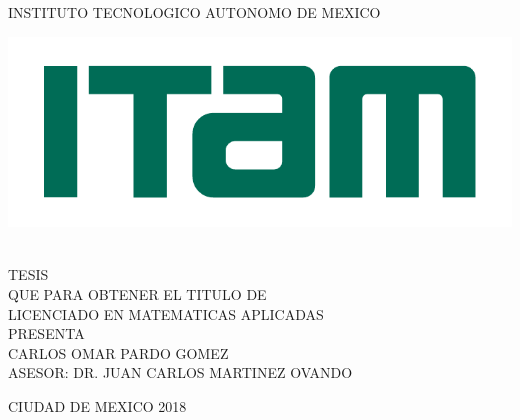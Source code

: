 \begin{titlepage}
\begin{center}

\large{INSTITUTO TECNOLOGICO AUTONOMO DE MEXICO}\\[2em]
\hline

\begin{center}
	\includegraphics{Figures/Miscellaneous/logo-ITAM.pdf}
\end{center}

\vspace{1em}

{}\\[2em]

\textsc{\large TESIS}\\[1em]

\textsc{\normalsize QUE PARA OBTENER EL TITULO DE}\\[1em]

\textsc{\normalsize LICENCIADO EN MATEMATICAS APLICADAS}\\[1em]

\textsc{\normalsize PRESENTA}\\[1em]

\textsc{\Large CARLOS OMAR PARDO GOMEZ}\\[3em]

\textsc{\normalsize ASESOR: DR. JUAN CARLOS MARTINEZ OVANDO}

\end{center}

\vspace*{\fill}
\textsc{CIUDAD DE MEXICO \hspace*{\fill} 2018}

\end{titlepage}
